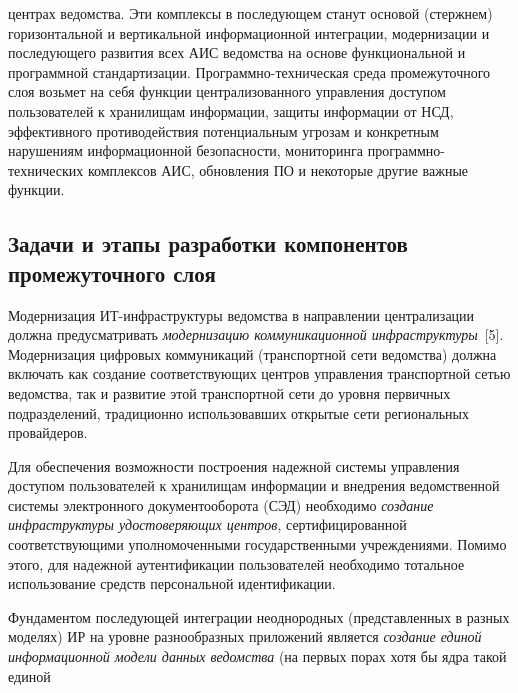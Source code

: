 \begin{multicols}{2}

\noindent
центрах ведомства. Эти комплексы в по\-сле\-ду\-ющем станут основой (стержнем) 
горизонтальной и вертикальной информационной интеграции, модернизации и последующего 
развития всех АИС ведомства на основе функциональной и программной стандартизации. 
Программно-техническая среда промежуточного слоя возьмет на себя функции 
централизованного управления доступом пользователей к хранилищам информации, защиты 
информации от НСД, эффективного противодействия потенциальным угрозам и конкретным 
нарушениям информационной безопасности, мониторинга программно-тех\-ни\-че\-ских 
комплексов АИС, об\-нов\-ле\-ния ПО и некоторые другие важные функции.

\subsection{Задачи и этапы разработки компонентов промежуточного слоя}

      Модернизация ИТ-ин\-фра\-струк\-ту\-ры ведомства в направлении централизации должна 
предусмат\-ри\-вать \textit{модернизацию коммуникационной инфраструктуры}~[5]. 
Модернизация цифровых коммуникаций (транспортной сети ведомства) должна включать как 
создание соответствующих центров управления транспортной сетью ведомства, так и развитие 
этой транспортной сети до уровня первичных подразделений, традиционно использовавших 
открытые сети региональных провайдеров.
      
      Для обеспечения возможности построения надежной системы управления доступом 
пользователей к хранилищам информации и внедрения ведомственной системы электронного 
документооборота (СЭД) необходимо \textit{создание инфраструктуры удостоверяющих 
центров}, сертифицированной соответствующими уполномоченными государственными 
учреждениями. Помимо этого, для надежной аутентификации пользователей необходимо 
тотальное использование средств персональной идентификации.
      
      Фундаментом последующей интеграции неоднородных (представленных в разных 
моделях) ИР на уровне разнообразных приложений является 
\textit{создание единой информационной модели данных ведомства} (на первых порах хотя бы 
ядра такой единой\linebreak\vspace*{-12pt}
\pagebreak
\end{multicols}

\begin{figure} %
\vspace*{1pt}
\begin{center}
\mbox{%
\epsfxsize=147.198mm
}
\end{center}
\vspace*{-3pt}
\vspace*{6pt}
\end{figure}

